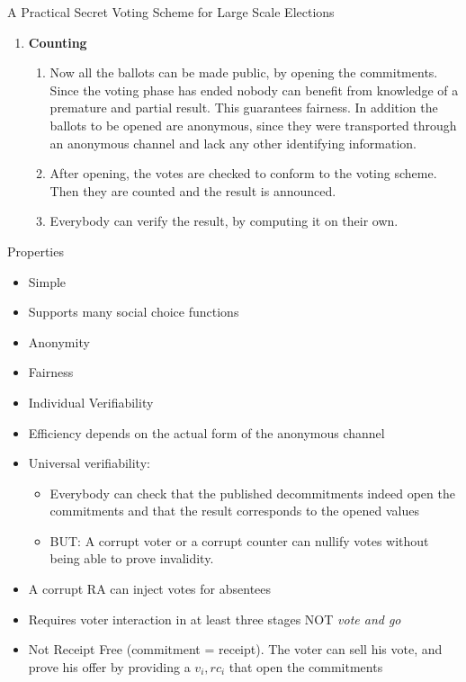 \documentclass{beamer}
\begin{document}
\begin{frame}[allowframebreaks]{A Practical Secret Voting Scheme for Large Scale Elections \cite{FOO92}}
\begin{enumerate}
\item \textbf{Counting}
\begin{enumerate}
\item Now all the ballots can be made public, by opening the commitments. Since the voting phase has ended nobody can benefit from knowledge of a premature and partial result. This guarantees fairness. In addition the ballots to be opened are anonymous, since they were transported through an anonymous channel and lack any other identifying information.
\item After opening, the votes are checked to conform to the voting scheme. Then they are counted and the result is announced.
\item Everybody can verify the result, by computing it on their own.
\end{enumerate}
\end{enumerate}

Properties
\begin{itemize}
\item Simple 
\item Supports many social choice functions
\item Anonymity
\item Fairness
\item Individual Verifiability
\item Efficiency depends on the actual form of the anonymous channel
\item Universal verifiability:
\begin{itemize}
\item Everybody can check that the published decommitments indeed open the commitments and that the result corresponds to the opened values
\item BUT: A corrupt voter or a corrupt counter can nullify votes without being able to prove invalidity.
\end{itemize}
\item A corrupt RA can inject votes for absentees
\item Requires voter interaction in at least three stages NOT \textit{vote and go}
\item Not Receipt Free (commitment = receipt). The voter can sell his vote, and prove his offer by providing a $v_i, rc_i$ that open the commitments
\end{itemize}
\end{frame}
 
\end{document}
